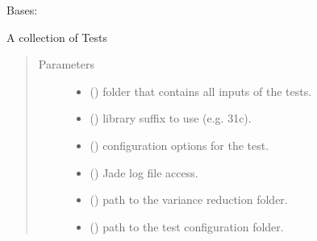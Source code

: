 \documentclass[letterpaper,10pt,english]{sphinxmanual}
\begin{document}
\begin{fulllineitems}
\label{\detokenize{api/inputgeneration:testrun.MultipleTest}}
\sphinxAtStartPar
Bases: 

\sphinxAtStartPar
A collection of Tests
\begin{quote}\begin{description}
\item[{Parameters}] \leavevmode\begin{itemize}
\item {} 
\sphinxAtStartPar
{} () \textendash{} folder that contains all inputs of the tests.

\item {} 
\sphinxAtStartPar
{} () \textendash{} library suffix to use (e.g. 31c).

\item {} 
\sphinxAtStartPar
{} (\sphinxstyleliteralemphasis{\sphinxupquote{ (}}\sphinxstyleliteralemphasis{\sphinxupquote{)}}) \textendash{} configuration options for the test.

\item {} 
\sphinxAtStartPar
{} () \textendash{} Jade log file access.

\item {} 
\sphinxAtStartPar
{} () \textendash{} path to the variance reduction folder.

\item {} 
\sphinxAtStartPar
{} () \textendash{} path to the test configuration folder.


\end{itemize}
\end{description}
\end{quote}
\end{fulllineitems}
\end{document}
